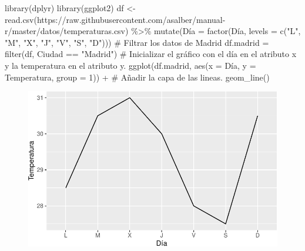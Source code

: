 \documentclass[
  a4paper,
]{scrreport}
\newenvironment{Shaded}{\begin{snugshade}}{\end{snugshade}}
\newcommand{\AttributeTok}[1]{\textcolor[rgb]{0.40,0.45,0.13}{#1}}
\newcommand{\CommentTok}[1]{\textcolor[rgb]{0.37,0.37,0.37}{#1}}
\newcommand{\DecValTok}[1]{\textcolor[rgb]{0.68,0.00,0.00}{#1}}
\newcommand{\FunctionTok}[1]{\textcolor[rgb]{0.28,0.35,0.67}{#1}}
\newcommand{\NormalTok}[1]{\textcolor[rgb]{0.00,0.23,0.31}{#1}}
\newcommand{\OtherTok}[1]{\textcolor[rgb]{0.00,0.23,0.31}{#1}}
\newcommand{\SpecialCharTok}[1]{\textcolor[rgb]{0.37,0.37,0.37}{#1}}
\newcommand{\StringTok}[1]{\textcolor[rgb]{0.13,0.47,0.30}{#1}}
\theoremstyle{definition}
\theoremstyle{definition}
\theoremstyle{remark}
\begin{document}
\begin{Shaded}
\begin{Highlighting}[]
\FunctionTok{library}\NormalTok{(dplyr)}
\FunctionTok{library}\NormalTok{(ggplot2)}
\NormalTok{df }\OtherTok{\textless{}{-}} \FunctionTok{read.csv}\NormalTok{(}\StringTok{\textquotesingle{}https://raw.githubusercontent.com/asalber/manual{-}r/master/datos/temperaturas.csv\textquotesingle{}}\NormalTok{) }\SpecialCharTok{\%\textgreater{}\%}
    \FunctionTok{mutate}\NormalTok{(Día }\OtherTok{=} \FunctionTok{factor}\NormalTok{(Día, }\AttributeTok{levels =} \FunctionTok{c}\NormalTok{(}\StringTok{"L"}\NormalTok{, }\StringTok{"M"}\NormalTok{, }\StringTok{"X"}\NormalTok{, }\StringTok{"J"}\NormalTok{, }\StringTok{"V"}\NormalTok{, }\StringTok{"S"}\NormalTok{, }\StringTok{"D"}\NormalTok{)))}
\CommentTok{\# Filtrar los datos de Madrid}
\NormalTok{df.madrid }\OtherTok{=} \FunctionTok{filter}\NormalTok{(df, Ciudad }\SpecialCharTok{==} \StringTok{"Madrid"}\NormalTok{)}
\CommentTok{\# Inicializar el gráfico con el día en el atributo x y la temperatura en el atributo y. }
\FunctionTok{ggplot}\NormalTok{(df.madrid, }\FunctionTok{aes}\NormalTok{(}\AttributeTok{x =}\NormalTok{ Día, }\AttributeTok{y =}\NormalTok{ Temperatura, }\AttributeTok{group =} \DecValTok{1}\NormalTok{)) }\SpecialCharTok{+}
\CommentTok{\# Añadir la capa de las lineas.}
    \FunctionTok{geom\_line}\NormalTok{()}
\end{Highlighting}
\end{Shaded}

\begin{figure}[H]

{\centering \includegraphics{07-graficos_files/figure-pdf/unnamed-chunk-6-1.pdf}

}

\end{figure}
\end{document}
